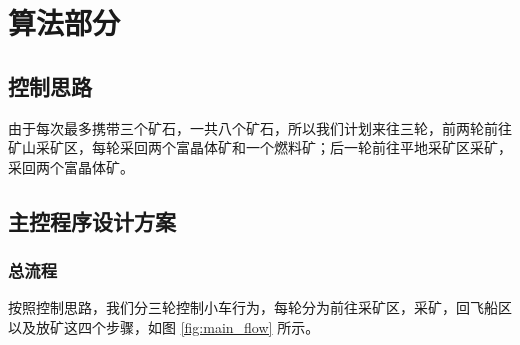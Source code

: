 \documentclass[10pt]{ctexart}
\begin{document}
\section{算法部分}
\subsection{控制思路}

由于每次最多携带三个矿石，一共八个矿石，所以我们计划来往三轮，前两轮前往矿山采矿区，每轮采回两个富晶体矿和一个燃料矿；后一轮前往平地采矿区采矿，采回两个富晶体矿。
\subsection{主控程序设计方案}
\subsubsection{总流程}

按照控制思路，我们分三轮控制小车行为，每轮分为前往采矿区，采矿，回飞船区以及放矿这四个步骤，如图 \ref{fig:main_flow} 所示。
\end{document}
